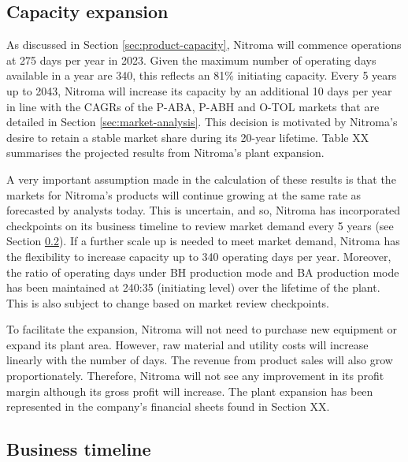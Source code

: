 \subsection{Capacity expansion}
\label{sec:expansion}
As discussed in Section \ref{sec:product-capacity}, Nitroma will commence operations at 275 days per year in 2023. Given the maximum number of operating days available in a year are 340, this reflects an 81\% initiating capacity. Every 5 years up to 2043, Nitroma will increase its capacity by an additional 10 days per year in line with the CAGRs of the P-ABA, P-ABH and O-TOL markets that are detailed in Section \ref{sec:market-analysis}.  This decision is motivated by Nitroma’s desire to retain a stable market share during its 20-year lifetime. Table XX summarises the projected results from Nitroma’s plant expansion.

A very important assumption made in the calculation of these results is that the markets for Nitroma’s products will continue growing at the same rate as forecasted by analysts today. This is uncertain, and so, Nitroma has incorporated checkpoints on its business timeline to review market demand every 5 years (see Section \ref{sec:business-timeline}). If a further scale up is needed to meet market demand, Nitroma has the flexibility to increase capacity up to 340 operating days per year. Moreover, the ratio of operating days under BH production mode and BA production mode has been maintained at 240:35 (initiating level) over the lifetime of the plant. This is also subject to change based on market review checkpoints.

To facilitate the expansion, Nitroma will not need to purchase new equipment or expand its plant area. However, raw material and utility costs will increase linearly with the number of days. The revenue from product sales will also grow proportionately. Therefore, Nitroma will not see any improvement in its profit margin although its gross profit will increase. The plant expansion has been represented in the company’s financial sheets found in Section XX.

\subsection{Business timeline}
\label{sec:business-timeline}

